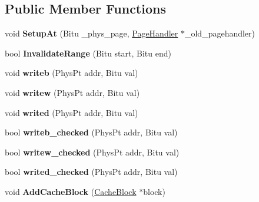 \subsection*{Public Member Functions}
\begin{DoxyCompactItemize}
\item 
\hypertarget{classCodePageHandler_a87c79ce5b4fb25644c482db4b20a3103}{void {\bfseries Setup\-At} (Bitu \-\_\-phys\-\_\-page, \hyperlink{classPageHandler}{Page\-Handler} $\ast$\-\_\-old\-\_\-pagehandler)}\label{classCodePageHandler_a87c79ce5b4fb25644c482db4b20a3103}

\item 
\hypertarget{classCodePageHandler_aca18fa1db74292e125d5e7ff9f5beda6}{bool {\bfseries Invalidate\-Range} (Bitu start, Bitu end)}\label{classCodePageHandler_aca18fa1db74292e125d5e7ff9f5beda6}

\item 
\hypertarget{classCodePageHandler_a698b91e9fae57e129e1e930db514734a}{void {\bfseries writeb} (Phys\-Pt addr, Bitu val)}\label{classCodePageHandler_a698b91e9fae57e129e1e930db514734a}

\item 
\hypertarget{classCodePageHandler_a4b6f320fe1f85b3056475216b1dacab5}{void {\bfseries writew} (Phys\-Pt addr, Bitu val)}\label{classCodePageHandler_a4b6f320fe1f85b3056475216b1dacab5}

\item 
\hypertarget{classCodePageHandler_a26b021b0c312de57c1492021982dc13d}{void {\bfseries writed} (Phys\-Pt addr, Bitu val)}\label{classCodePageHandler_a26b021b0c312de57c1492021982dc13d}

\item 
\hypertarget{classCodePageHandler_aec57c55fad4cd460717c239bd1474e6e}{bool {\bfseries writeb\-\_\-checked} (Phys\-Pt addr, Bitu val)}\label{classCodePageHandler_aec57c55fad4cd460717c239bd1474e6e}

\item 
\hypertarget{classCodePageHandler_ac357bfc5ec260b491451e6f8ea44a138}{bool {\bfseries writew\-\_\-checked} (Phys\-Pt addr, Bitu val)}\label{classCodePageHandler_ac357bfc5ec260b491451e6f8ea44a138}

\item 
\hypertarget{classCodePageHandler_ac398f0075a3cc49afc076e25653da4c6}{bool {\bfseries writed\-\_\-checked} (Phys\-Pt addr, Bitu val)}\label{classCodePageHandler_ac398f0075a3cc49afc076e25653da4c6}

\item 
\hypertarget{classCodePageHandler_a4394a3a0c612f147e9313c32ad5a2ef2}{void {\bfseries Add\-Cache\-Block} (\hyperlink{classCacheBlock}{Cache\-Block} $\ast$block)}\label{classCodePageHandler_a4394a3a0c612f147e9313c32ad5a2ef2}


\end{DoxyCompactItemize}

